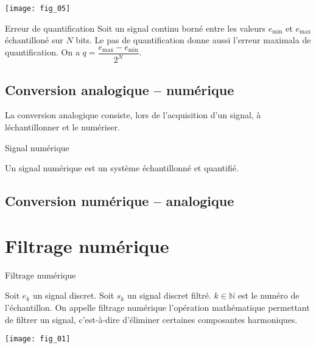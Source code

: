 \begin{center}
\texttt{[image: fig\_05]}
\end{center}


\begin{defi}{Erreur de quantification}
Soit un signal continu borné entre les valeurs $e_{\text{min}}$ et $e_{\text{max}}$ échantilloné sur $N$ bits. Le pas de quantification donne aussi l'erreur maximala de quantification. On a $q = \dfrac{e_{\text{max}}-e_{\text{min}}}{2^N}$.

\end{defi}


\subsection{Conversion analogique -- numérique}
La conversion analogique consiste, lors de l'acquisition d'un signal, à léchantillonner et le  numériser. 
\begin{defi}{Signal numérique}

Un signal numérique est un système échantillonné et quantifié. 

\end{defi}

\subsection{Conversion numérique -- analogique}

\section{Filtrage numérique}
\begin{defi}{Filtrage numérique}~\\
\begin{minipage}[c]{.7\linewidth}
Soit $e_k$ un signal discret. Soit $s_k$ un signal discret filtré. $k\in \mathbb{N}$ est le numéro de l'échantillon. On appelle filtrage numérique l'opération mathématique permettant de filtrer un signal, c'est-à-dire d'éliminer certaines composantes harmoniques. 
\end{minipage} \hfill
\begin{minipage}[c]{.25\linewidth}
\begin{center}
\texttt{[image: fig\_01]}
\end{center}
\end{minipage}
\end{defi}

